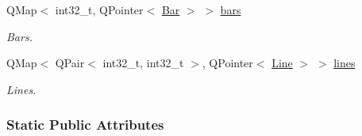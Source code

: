\begin{DoxyCompactItemize}
Q\+Map$<$ int32\+\_\+t, Q\+Pointer$<$ \hyperlink{class_bar}{Bar} $>$ $>$ \hyperlink{class_network_ae37a8418e42adf765b143cdc9d992b6c}{bars}
\begin{DoxyCompactList}\small\item\em Bars. \end{DoxyCompactList}\item 
Q\+Map$<$ Q\+Pair$<$ int32\+\_\+t, int32\+\_\+t $>$, Q\+Pointer$<$ \hyperlink{class_line}{Line} $>$ $>$ \hyperlink{class_network_a49659f95d02baf087707c5a94fa23d90}{lines}
\begin{DoxyCompactList}\small\item\em Lines. \end{DoxyCompactList}\end{DoxyCompactItemize}
\subsubsection*{Static Public Attributes}
